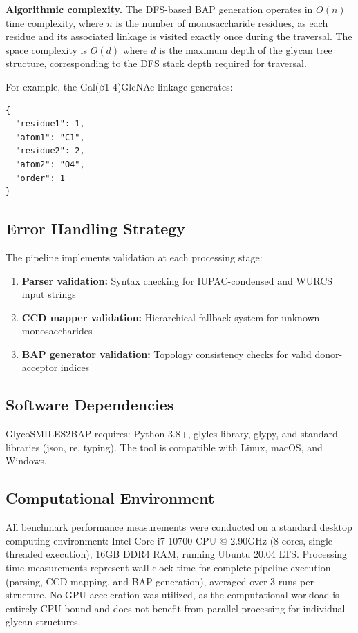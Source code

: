 \textbf{Algorithmic complexity.} The DFS-based BAP generation operates in $O(n)$ time complexity, where $n$ is the number of monosaccharide residues, as each residue and its associated linkage is visited exactly once during the traversal. The space complexity is $O(d)$ where $d$ is the maximum depth of the glycan tree structure, corresponding to the DFS stack depth required for traversal.

For example, the Gal($\beta$1-4)GlcNAc linkage generates:
\begin{verbatim}
{
  "residue1": 1,
  "atom1": "C1",
  "residue2": 2,
  "atom2": "O4",
  "order": 1
}
\end{verbatim}

\subsection{Error Handling Strategy}

The pipeline implements validation at each processing stage:
\begin{enumerate}
\item \textbf{Parser validation:} Syntax checking for IUPAC-condensed and WURCS input strings
\item \textbf{CCD mapper validation:} Hierarchical fallback system for unknown monosaccharides
\item \textbf{BAP generator validation:} Topology consistency checks for valid donor-acceptor indices
\end{enumerate}

\subsection{Software Dependencies}

GlycoSMILES2BAP requires: Python 3.8+, glyles library, glypy, and standard libraries (json, re, typing). The tool is compatible with Linux, macOS, and Windows.

\subsection{Computational Environment}

All benchmark performance measurements were conducted on a standard desktop computing environment: Intel Core i7-10700 CPU @ 2.90GHz (8 cores, single-threaded execution), 16GB DDR4 RAM, running Ubuntu 20.04 LTS. Processing time measurements represent wall-clock time for complete pipeline execution (parsing, CCD mapping, and BAP generation), averaged over 3 runs per structure. No GPU acceleration was utilized, as the computational workload is entirely CPU-bound and does not benefit from parallel processing for individual glycan structures.

